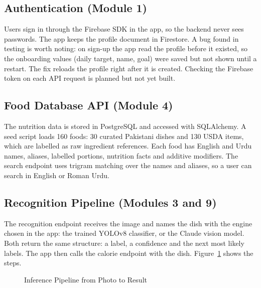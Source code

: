 \subsection{Authentication (Module 1)}
Users sign in through the Firebase SDK in the app, so the backend never sees passwords. The app keeps the
profile document in Firestore. A bug found in testing is worth noting: on sign-up the app read the profile
before it existed, so the onboarding values (daily target, name, goal) were saved but not shown until a restart.
The fix reloads the profile right after it is created. Checking the Firebase token on each API request is
planned but not yet built.

\subsection{Food Database API (Module 4)}
The nutrition data is stored in PostgreSQL and accessed with SQLAlchemy. A seed script loads 160 foods: 30
curated Pakistani dishes and 130 USDA items, which are labelled as raw ingredient references. Each food has
English and Urdu names, aliases, labelled portions, nutrition facts and additive modifiers. The search
endpoint uses trigram matching over the names and aliases, so a user can search in English or Roman Urdu.

\subsection{Recognition Pipeline (Modules 3 and 9)}\label{sec:pipeline}
The recognition endpoint receives the image and names the dish with the engine chosen in the app: the trained
YOLOv8 classifier, or the Claude vision model. Both return the same structure: a label, a confidence and the
next most likely labels. The app then calls the calorie endpoint with the dish. Figure~\ref{fig:pipe} shows the
steps.

\begin{figure}[H]
\centering
{}
\caption{Inference Pipeline from Photo to Result}
\label{fig:pipe}
\end{figure}

